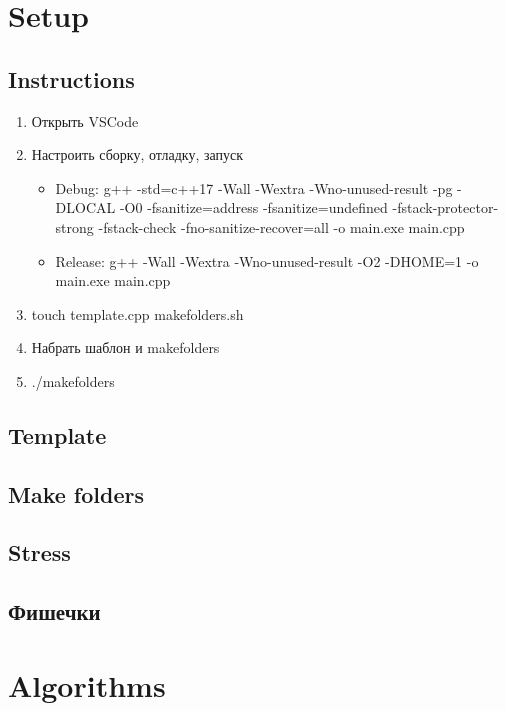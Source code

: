 \documentclass[10pt]{article}
\begin{document}
\pagestyle{fancy}

\begin{multicols}{2}

\tableofcontents

\section{Setup}
\subsection{Instructions}
\begin{enumerate}
  \item Открыть VSCode
  \item Настроить сборку, отладку, запуск
  \begin{itemize}
    \item Debug: g++ -std=c++17 -Wall 
    -Wextra -Wno-unused-result -pg 
    -DLOCAL -O0 -fsanitize=address 
    -fsanitize=undefined 
    -fstack-protector-strong -fstack-check 
    -fno-sanitize-recover=all -o main.exe main.cpp
    \item Release: g++ -Wall -Wextra 
    -Wno-unused-result -O2 -DHOME=1 -o main.exe main.cpp
  \end{itemize}  
  \item touch template.cpp makefolders.sh
  \item Набрать шаблон и makefolders
  \item ./makefolders
\end{enumerate}
\subsection{Template}

\subsection{Make folders}

\subsection{Stress}

\subsection{Фишечки}

\section{Algorithms}

\end{multicols}
\end{document}
